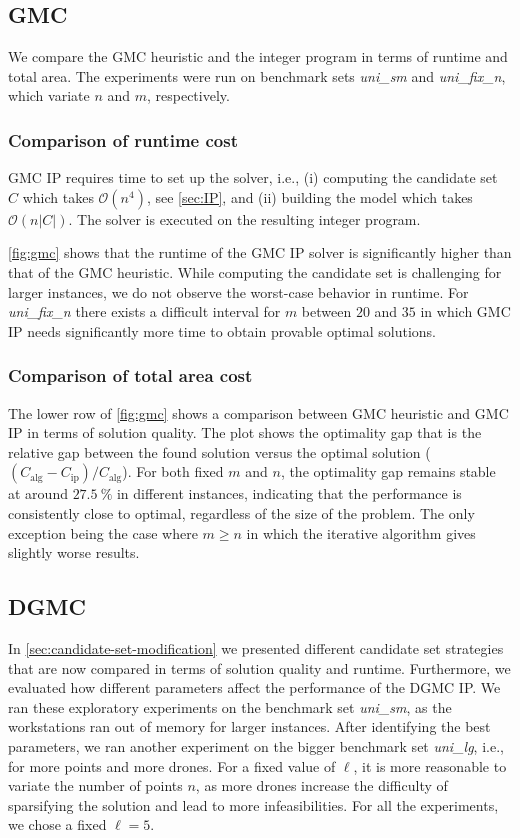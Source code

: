 \documentclass[letterpaper, 10 pt, conference]{ieeeconf}
\newcommand{\bigO}{\mathcal{O}} %
\newcommand{\smallFixM}{\emph{uni\_sm}}
\newcommand{\largeFixM}{\emph{uni\_lg}}
\newcommand{\fixN}{\emph{uni\_fix\_n}}
\newcommand{\gmcip}{GMC IP}
\newcommand{\dgmcip}{DGMC IP}
\newcommand{\iteralg}{GMC heuristic}
\begin{document}
\subsection{GMC}

We compare the \iteralg{} and the integer program in terms of runtime and total area.
The experiments were run on benchmark sets \smallFixM{} and \fixN{}, which variate $n$ and $m$, respectively.

\subsubsection{Comparison of runtime cost}
\gmcip{} requires time to set up the solver, i.e.,
(i) computing the candidate set $C$ which takes $\bigO(n^4)$, see \cref{sec:IP},
and (ii) building the model which takes $\bigO(n|C|)$.
The solver is executed on the resulting integer program.

\cref{fig:gmc} shows that the runtime of the \gmcip{} solver is significantly higher than that of the \iteralg{}.
While computing the candidate set is challenging for larger instances, we do not observe the worst-case behavior in runtime.
For \fixN{} there exists a difficult interval for $m$ between $20$ and $35$ in which \gmcip{} needs significantly more time to obtain provable optimal solutions.



\subsubsection{Comparison of total area cost}

The lower row of \cref{fig:gmc} shows a comparison between \iteralg{} and \gmcip{} in terms of solution quality.
The plot shows the optimality gap that is the relative gap between the found solution versus the optimal solution ($(C_{\textrm{alg}}-C_{\textrm{ip}})/C_{\textrm{alg}}$).
For both fixed $m$ and $n$, the optimality gap remains stable at around $\SI{27.5}{\percent}$ in different instances, indicating that the performance is consistently close to optimal, regardless of the size of the problem.
The only exception being the case where $m \geq n$ in which the iterative algorithm gives slightly worse results.

\subsection{DGMC}

In \cref{sec:candidate-set-modification} we presented different candidate set strategies that are now compared in terms of solution quality and runtime.
Furthermore, we evaluated how different parameters affect the performance of the \dgmcip{}.
We ran these exploratory experiments on the benchmark set \smallFixM{}, as the workstations ran out of memory for larger instances.
After identifying the best parameters, we ran another experiment on the bigger benchmark set \largeFixM{}, i.e., for more points and more drones. 
For a fixed value of $\ell$, it is more reasonable to variate the number of points $n$, as more drones increase the difficulty of sparsifying the solution and lead to more infeasibilities.
For all the experiments, we chose a fixed $\ell=5$.
\end{document}
